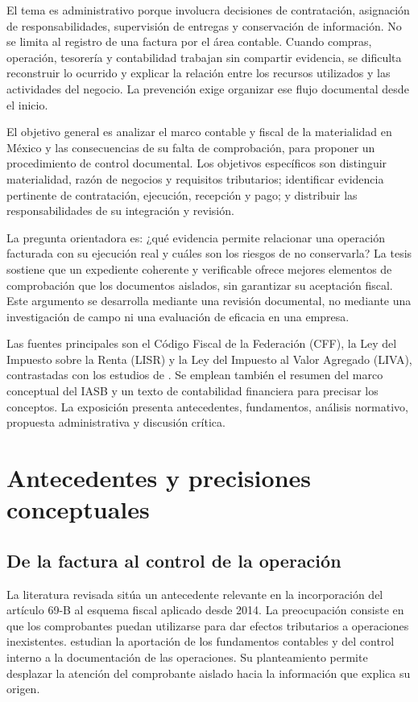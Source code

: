El tema es administrativo porque involucra decisiones de contratación,
asignación de responsabilidades, supervisión de entregas y conservación de
información. No se limita al registro de una factura por el área contable.
Cuando compras, operación, tesorería y contabilidad trabajan sin compartir
evidencia, se dificulta reconstruir lo ocurrido y explicar la relación entre
los recursos utilizados y las actividades del negocio. La prevención exige
organizar ese flujo documental desde el inicio.

El objetivo general es analizar el marco contable y fiscal de la materialidad
en México y las consecuencias de su falta de comprobación, para proponer un
procedimiento de control documental. Los objetivos específicos son distinguir
materialidad, razón de negocios y requisitos tributarios; identificar evidencia
pertinente de contratación, ejecución, recepción y pago; y distribuir las
responsabilidades de su integración y revisión.

La pregunta orientadora es: ¿qué evidencia permite relacionar una operación
facturada con su ejecución real y cuáles son los riesgos de no conservarla?
La tesis sostiene que un expediente coherente y verificable ofrece mejores
elementos de comprobación que los documentos aislados, sin garantizar su
aceptación fiscal. Este argumento se desarrolla mediante una revisión
documental, no mediante una investigación de campo ni una evaluación de
eficacia en una empresa.

Las fuentes principales son el Código Fiscal de la Federación (CFF), la Ley
del Impuesto sobre la Renta (LISR) y la Ley del Impuesto al Valor Agregado
(LIVA), contrastadas con los estudios de
\textcite{arrona2022certeza,rico2023mecanismo,rico2024consecuencias}. Se emplean
también el resumen del marco conceptual del IASB y un texto de contabilidad
financiera para precisar los conceptos. La exposición presenta antecedentes,
fundamentos, análisis normativo, propuesta administrativa y discusión crítica.

\section{Antecedentes y precisiones conceptuales}

\subsection{De la factura al control de la operación}

La literatura revisada sitúa un antecedente relevante en la incorporación del
artículo 69-B al esquema fiscal aplicado desde 2014. La preocupación consiste
en que los comprobantes puedan utilizarse para dar efectos tributarios a
operaciones inexistentes. \textcite{arrona2022certeza} estudian la aportación
de los fundamentos contables y del control interno a la documentación de las
operaciones. Su planteamiento permite desplazar la atención del comprobante
aislado hacia la información que explica su origen.

